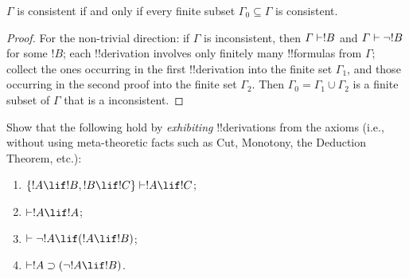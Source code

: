 \documentclass[../../include/open-logic-section]{subfiles}
\begin{document}
\begin{prop}
  $\Gamma$ is consistent if and only if every finite subset
  $\Gamma_0\subseteq \Gamma$ is consistent.
\end{prop}

\begin{proof}
For the non-trivial direction: if $\Gamma$ is inconsistent, then
$\Gamma \Proves !B$ and $\Gamma \Proves \lnot !B$ for some $!B$; each
!!{derivation} involves only finitely many !!{formula}s from $\Gamma$;
collect the ones occurring in the first !!{derivation} into the finite
set $\Gamma_1$, and those occurring in the second proof into the
finite set $\Gamma_2$. Then $\Gamma_0 = \Gamma_1 \cup \Gamma_2$ is a
finite subset of $\Gamma$ that is a inconsistent.
\end{proof}


\begin{prob}
Show that the following hold by \emph{exhibiting} !!{derivation}s from the
axioms (i.e., without using meta-theoretic facts such as Cut,
  Monotony, the Deduction Theorem, etc.):
\begin{enumerate}
\item $\{!A\lif !B, !B\lif !C\} \Proves !A\lif !C$;
\item $\Proves !A \lif !A$;
\item $\Proves \lnot !A \lif (!A \lif !B)$;
\item $\Proves !A \supset (\lnot !A \lif !B)$.
\end{enumerate}
\end{prob}
\end{document}
